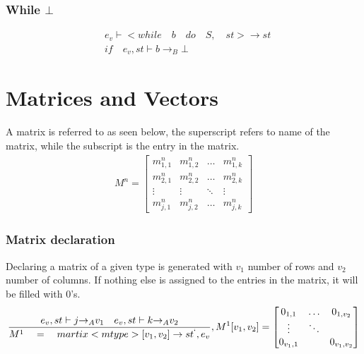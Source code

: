 \subsubsection{While $\bot$}
\begin{align*}
	&{ e }_{ v }\vdash <while\quad b\quad do\quad S,\quad st>\rightarrow st\\
	&if\quad { e }_{ v },st\vdash b{ \rightarrow  }_{ B }\bot
\end{align*}

\section*{Matrices and Vectors}
A matrix is referred to as seen below, the superscript refers to name of the matrix, while the subscript is the entry in the matrix.
\begin{align*}
	M^{n}= \begin{bmatrix} { { m }_{ 1,1 }^{ n } } & { { m }_{ 1,2 }^{ n } } & \dots  & { m }_{ 1,k }^{ n } \\
{ { m }_{ 2,1 }^{ n } }  &  { { m }_{ 2,2 }^{ n } } & \dots & { m }_{ 2,k }^{ n }
\\ \vdots  & \vdots & \ddots  & \vdots \\
 { m }_{ j,1 }^{ n } & { m }_{ j,2 }^{ n } & \dots & { m }_{ j,k }^{ n } \end{bmatrix}
\end{align*}

\subsubsection{Matrix declaration}
Declaring a matrix of a given type is generated with ${ v }_{ 1 }$ number of rows and ${ v }_{ 2 }$ number of columns. 
If nothing else is assigned to the entries in the matrix, it will be filled with $0$'s.
\begin{equation}
	\frac { { e }_{ v },st\vdash j{ \rightarrow  }_{ A }{ v }_{ 1 }\quad { e }_{ v },st\vdash k{ \rightarrow  }_{ A }{ v }_{ 2 } }{ { M }^{ 1 }\quad =\quad martix<mtype>[{ v }_{ 1 },{ v }_{ 2 }]\rightarrow { st }^{ ` },{ e }_{ v } } ,{ M }^{ 1 }[{ v }_{ 1 },{ v }_{ 2 }]=\begin{bmatrix} { { 0 }_{ 1,1 } } & \dots  & { 0 }_{ { 1,{ v }_{ 2 } } } \\ \vdots  & \ddots  &  \\ { 0 }_{ { v }_{ 1 },1 } &  & { 0 }_{ { v }_{ 1 },{ v }_{ 2 } } \end{bmatrix}
\end{equation}

